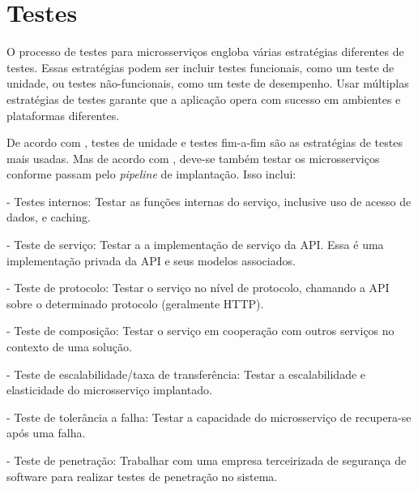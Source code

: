 \section{Testes}

O processo de testes para microsserviços engloba várias estratégias diferentes de testes. Essas estratégias podem ser incluir testes funcionais, como um teste de unidade, ou testes não-funcionais, como um teste de desempenho. Usar múltiplas estratégias de testes garante que a aplicação opera com sucesso em ambientes e plataformas diferentes. 


De acordo com , testes de unidade e testes fim-a-fim são as estratégias de testes mais usadas. Mas de acordo com \cite{Familiar2015}, deve-se também testar os microsserviços conforme passam pelo \emph{pipeline} de implantação. Isso inclui:

- Testes internos: Testar as funções internas do serviço, inclusive uso de acesso de dados, e caching.

- Teste de serviço: Testar a a implementação de serviço da API. Essa é uma implementação privada da API e seus modelos associados.

- Teste de protocolo: Testar o serviço no nível de protocolo, chamando a API sobre o determinado protocolo (geralmente HTTP).

- Teste de composição: Testar o serviço em cooperação com outros serviços no contexto de uma solução.

- Teste de escalabilidade/taxa de transferência: Testar a escalabilidade e elasticidade do microsserviço implantado.

- Teste de tolerância a falha: Testar a capacidade do microsserviço de recupera-se após uma falha.

- Teste de penetração: Trabalhar com uma empresa terceirizada de segurança de software para realizar testes de penetração no sistema. \cite{Familiar2015}




